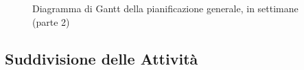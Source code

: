 \begin{figure}[H]
\label{tab:genweeks}
\caption{Diagramma di Gantt della pianificazione generale, in settimane (parte 2)}
\end{figure}




\subsection{Suddivisione delle Attività}
